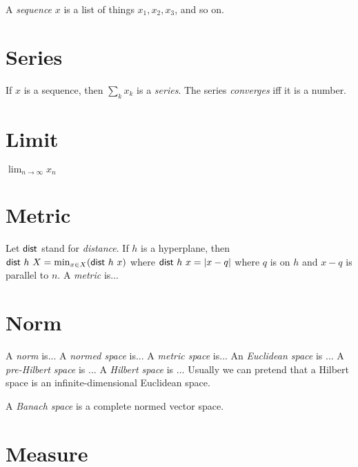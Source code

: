 %
A \emph{sequence} \(x\) is a list of things \(x_1, x_2, x_3\), and so on.

\section{Series}

%
If \(x\) is a sequence, then \(\sum_k x_k\) is a \emph{series}.
The series \emph{converges} iff it is a number.

\section{Limit}

\(\lim_{n \to \infty} x_n\)

\section{Metric}

%
%
Let \(\textsf{dist}\) stand for \emph{distance}.
If \(h\) is a hyperplane,
then \(\textsf{dist}~h~X = \min_{x \in X} (\textsf{dist}~h~x)\)
where \(\textsf{dist}~h~x = |x-q|\) where \(q\) is on \(h\) and \(x-q\) is parallel to \(n\).
%
A \emph{metric} is...

\section{Norm}

%
A \emph{norm} is...
%
%
A \emph{normed space} is...
%
%
A \emph{metric space} is...
%
%
An \emph{Euclidean space} is ...
%
%
A \emph{pre-Hilbert space} is ...
%
%
A \emph{Hilbert space} is ...
Usually we can pretend that a Hilbert space is an infinite-dimensional Euclidean space.

%
%
A \emph{Banach space} is a complete normed vector space.

\section{Measure}


